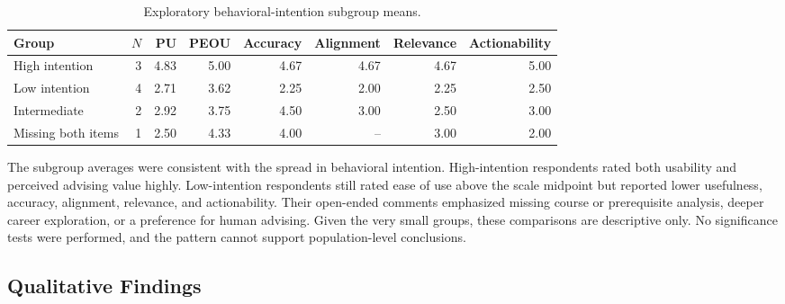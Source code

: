 \documentclass[letterpaper,11pt]{article}
\newcommand{\DIFadd}[1]{%
  \begingroup\setlength{\fboxsep}{0.5pt}%
  \colorbox{diffaddbg}{\textcolor{diffaddtext}{#1}}%
  \endgroup}
\begin{document}
\begin{table}[htbp]
\caption{Exploratory behavioral-intention subgroup means.}
\label{tab:subgroups}
\centering
\begin{tabular}{@{}lrrrrrrr@{}}
\toprule
\textbf{Group} & \textbf{$N$} & \textbf{PU} & \textbf{PEOU} & \textbf{Accuracy} & \textbf{Alignment} & \textbf{Relevance} & \textbf{Actionability} \\
\midrule
High intention & 3 & 4.83 & 5.00 & 4.67 & 4.67 & 4.67 & 5.00 \\
Low intention & 4 & 2.71 & 3.62 & 2.25 & 2.00 & 2.25 & 2.50 \\
Intermediate & 2 & 2.92 & 3.75 & 4.50 & 3.00 & 2.50 & 3.00 \\
Missing both items & 1 & 2.50 & 4.33 & 4.00 & -- & 3.00 & 2.00 \\
\bottomrule
\end{tabular}
\end{table}

\DIFadd{The} \DIFadd{subgroup} \DIFadd{averages} \DIFadd{were} \DIFadd{consistent} \DIFadd{with} \DIFadd{the} \DIFadd{spread} \DIFadd{in} \DIFadd{behavioral} \DIFadd{intention.} \DIFadd{High-intention} \DIFadd{respondents} \DIFadd{rated} \DIFadd{both} \DIFadd{usability} \DIFadd{and} \DIFadd{perceived} \DIFadd{advising} \DIFadd{value} \DIFadd{highly.} \DIFadd{Low-intention} \DIFadd{respondents} \DIFadd{still} \DIFadd{rated} \DIFadd{ease} \DIFadd{of} \DIFadd{use} \DIFadd{above} \DIFadd{the} \DIFadd{scale} \DIFadd{midpoint} \DIFadd{but} \DIFadd{reported} \DIFadd{lower} \DIFadd{usefulness,} \DIFadd{accuracy,} \DIFadd{alignment,} \DIFadd{relevance,} \DIFadd{and} \DIFadd{actionability.} \DIFadd{Their} \DIFadd{open-ended} \DIFadd{comments} \DIFadd{emphasized} \DIFadd{missing} \DIFadd{course} \DIFadd{or} \DIFadd{prerequisite} \DIFadd{analysis,} \DIFadd{deeper} \DIFadd{career} \DIFadd{exploration,} \DIFadd{or} \DIFadd{a} \DIFadd{preference} \DIFadd{for} \DIFadd{human} \DIFadd{advising.} \DIFadd{Given} \DIFadd{the} \DIFadd{very} \DIFadd{small} \DIFadd{groups,} \DIFadd{these} \DIFadd{comparisons} \DIFadd{are} \DIFadd{descriptive} \DIFadd{only.} \DIFadd{No} \DIFadd{significance} \DIFadd{tests} \DIFadd{were} \DIFadd{performed,} \DIFadd{and} \DIFadd{the} \DIFadd{pattern} \DIFadd{cannot} \DIFadd{support} \DIFadd{population-level} \DIFadd{conclusions.}

\subsection{Qualitative Findings}\label{subsec:qualfindings}
\end{document}
